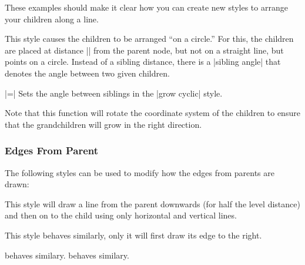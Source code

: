 \begin{itemize}
  These examples should make it clear how you can create new styles to
  arrange your children along a line.

  This style causes the children to be arranged ``on a circle.'' For
  this, the children are placed at distance |\tikzleveldistance| from
  the parent node, but not on a straight line, but points on a
  circle. Instead of a sibling distance, there is a |sibling angle|
  that denotes the angle between two given children.
  \begin{itemize}
    |=|
    Sets the angle between siblings in the |grow cyclic| style.
  \end{itemize}
  Note that this function will rotate the coordinate system of the
  children to ensure that the grandchildren will grow in the right
  direction.
\begin{codeexample}[]
\end{codeexample}
\end{itemize}

\subsubsection{Edges From Parent}

The following styles can be used to modify how the edges from parents
are drawn:

\begin{itemize}
  This style will draw a line from the parent downwards (for half the
  level distance) and then on to the child using only horizontal and
  vertical lines. 
\begin{codeexample}[]
\end{codeexample}
  This style behaves similarly, only it will first draw its edge to
  the right.
\begin{codeexample}[]
\end{codeexample}
  behaves similary. 
  behaves similary. 
\end{itemize}



